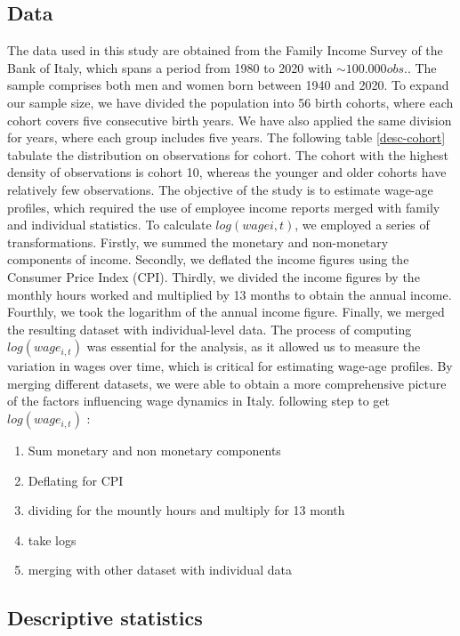 \documentclass[14pt]{sistedes}
\begin{document}
\subsection{Data}
The data used in this study are obtained from the Family Income Survey of the Bank of Italy, which spans a period from 1980 to 2020 with $\sim100.000 obs.$. The sample comprises both men and women born between 1940 and 2020. To expand our sample size, we have divided the population into 56 birth cohorts, where each cohort covers five consecutive birth years. We have also applied the same division for years, where each group includes five years. The following table \ref{desc-cohort} tabulate the distribution on observations for cohort.
The cohort with the highest density of observations is cohort 10, whereas the younger and older cohorts have relatively few observations.
The objective of the study is to estimate wage-age profiles, which required the use of employee income reports merged with family and individual statistics. To calculate $log(wagei,t)$, we employed a series of transformations. Firstly, we summed the monetary and non-monetary components of income. Secondly, we deflated the income figures using the Consumer Price Index (CPI). Thirdly, we divided the income figures by the monthly hours worked and multiplied by 13 months to obtain the annual income. Fourthly, we took the logarithm of the annual income figure. Finally, we merged the resulting dataset with individual-level data.
\newline
The process of computing \(log(wage_{i,t})\) was essential for the analysis, as it allowed us to measure the variation in wages over time, which is critical for estimating wage-age profiles. By merging different datasets, we were able to obtain a more comprehensive picture of the factors influencing wage dynamics in Italy.  following step to get \(log(wage_{i,t})\) :
\begin{enumerate}
    \item Sum monetary and non monetary components 
    \item Deflating for CPI
    \item dividing for the mountly hours and multiply for 13 month
    \item take logs
    \item merging with other dataset with individual data
\end{enumerate}
\subsection{Descriptive statistics}
\end{document}
